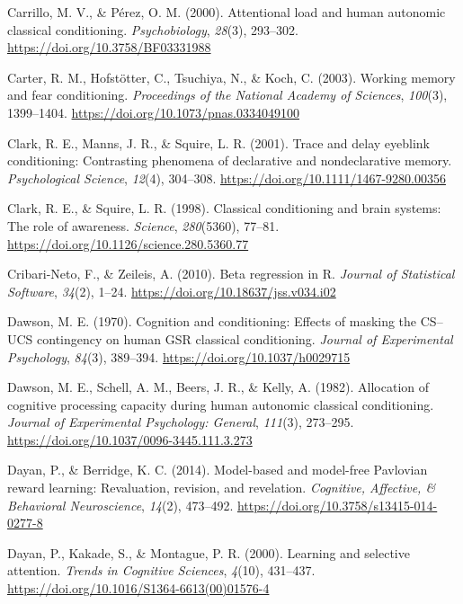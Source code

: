 \documentclass[
  man,
  floatsintext,
  longtable,
  nolmodern,
  notxfonts,
  notimes,
  mask,
  colorlinks=true,linkcolor=blue,citecolor=blue,urlcolor=blue]{apa7}
\newlength{\cslhangindent}
\newenvironment{CSLReferences}[2] %
 {\begin{list}{}{%
  \setlength{\itemindent}{0pt}
  \setlength{\leftmargin}{0pt}
  \setlength{\parsep}{0pt}
  \ifodd #1
   \setlength{\leftmargin}{\cslhangindent}
   \setlength{\itemindent}{-1\cslhangindent}
  \fi
  \setlength{\itemsep}{#2\baselineskip}}}
 {\end{list}}
\begin{document}
\begin{CSLReferences}{1}{0}
Carrillo, M. V., \& Pérez, O. M. (2000). Attentional load and human
autonomic classical conditioning. \emph{Psychobiology}, \emph{28}(3),
293--302. \url{https://doi.org/10.3758/BF03331988}

Carter, R. M., Hofstötter, C., Tsuchiya, N., \& Koch, C. (2003). Working
memory and fear conditioning. \emph{Proceedings of the National Academy
of Sciences}, \emph{100}(3), 1399--1404.
\url{https://doi.org/10.1073/pnas.0334049100}

Clark, R. E., Manns, J. R., \& Squire, L. R. (2001). Trace and delay
eyeblink conditioning: Contrasting phenomena of declarative and
nondeclarative memory. \emph{Psychological Science}, \emph{12}(4),
304--308. \url{https://doi.org/10.1111/1467-9280.00356}

Clark, R. E., \& Squire, L. R. (1998). Classical conditioning and brain
systems: The role of awareness. \emph{Science}, \emph{280}(5360),
77--81. \url{https://doi.org/10.1126/science.280.5360.77}

Cribari-Neto, F., \& Zeileis, A. (2010). Beta regression in {R}.
\emph{Journal of Statistical Software}, \emph{34}(2), 1--24.
\url{https://doi.org/10.18637/jss.v034.i02}

Dawson, M. E. (1970). Cognition and conditioning: Effects of masking the
{CS}--{UCS} contingency on human {GSR} classical conditioning.
\emph{Journal of Experimental Psychology}, \emph{84}(3), 389--394.
\url{https://doi.org/10.1037/h0029715}

Dawson, M. E., Schell, A. M., Beers, J. R., \& Kelly, A. (1982).
Allocation of cognitive processing capacity during human autonomic
classical conditioning. \emph{Journal of Experimental Psychology:
General}, \emph{111}(3), 273--295.
\url{https://doi.org/10.1037/0096-3445.111.3.273}

Dayan, P., \& Berridge, K. C. (2014). Model-based and model-free
Pavlovian reward learning: Revaluation, revision, and revelation.
\emph{Cognitive, Affective, \& Behavioral Neuroscience}, \emph{14}(2),
473--492. \url{https://doi.org/10.3758/s13415-014-0277-8}

Dayan, P., Kakade, S., \& Montague, P. R. (2000). Learning and selective
attention. \emph{Trends in Cognitive Sciences}, \emph{4}(10), 431--437.
\url{https://doi.org/10.1016/S1364-6613(00)01576-4}


\end{CSLReferences}
\end{document}
